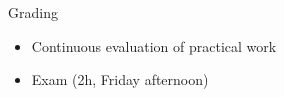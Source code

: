 \documentclass[xcolor=pdftex,dvipsnames,table,mathserif]{beamer}
\begin{document}
\begin{frame}{Grading}

\begin{itemize}
\item Continuous evaluation of practical work
\item Exam (2h, Friday afternoon)
\end{itemize}

\end{frame}











\end{document}
